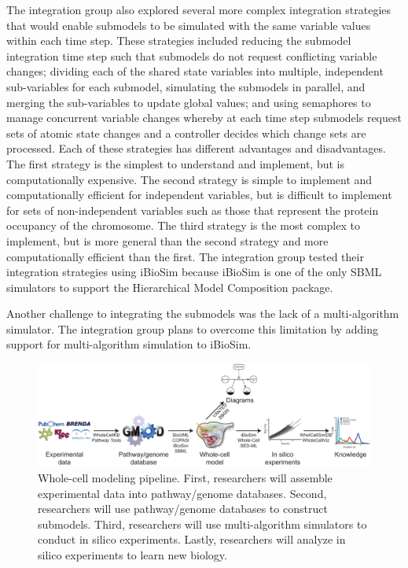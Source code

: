 \documentclass[journal,transmag]{IEEEtran}
\begin{document}
The integration group also explored several more complex integration strategies that would enable submodels to be simulated with the same variable values within each time step. These strategies included reducing the submodel integration time step such that submodels do not request conflicting variable changes; dividing each of the shared state variables into multiple, independent sub-variables for each submodel, simulating the submodels in parallel, and merging the sub-variables to update global values; and using semaphores to manage concurrent variable changes whereby at each time step submodels request sets of atomic state changes and a controller decides which change sets are processed. Each of these strategies has different advantages and disadvantages. The first strategy is the simplest to understand and implement, but is computationally expensive. The second strategy is simple to implement and computationally efficient for independent variables, but is difficult to implement for sets of non-independent variables such as those that represent the protein occupancy of the chromosome. The third strategy is the most complex to implement, but is more general than the second strategy and more computationally efficient than the first. The integration group tested their integration strategies using iBioSim because iBioSim is one of the only SBML simulators to support the Hierarchical Model Composition package.

Another challenge to integrating the submodels was the lack of a multi-algorithm simulator. The integration group plans to overcome this limitation by adding support for multi-algorithm simulation to iBioSim.

\begin{figure}[bt!]
\centering
\includegraphics[width=\textwidth]{figure1/figure1.pdf}
\caption{\label{fig:1} Whole-cell modeling pipeline. First, researchers will assemble experimental data into pathway/genome databases. Second, researchers will use pathway/genome databases to construct submodels. Third, researchers will use multi-algorithm simulators to conduct in silico experiments. Lastly, researchers will analyze in silico experiments to learn new biology.}
\end{figure}
\end{document}
